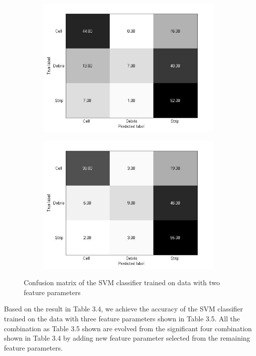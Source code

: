 \begin{figure}[!h]
\begin{subfigure}[b]{0.3\textwidth}
    \includegraphics[width=\textwidth]{confusion_matrix/fig3_3_e.jpg}
    \caption{}
  \end{subfigure}
  \begin{subfigure}[b]{0.3\textwidth}
    \includegraphics[width=\textwidth]{confusion_matrix/fig3_3_f.jpg}
    \caption{}
  \end{subfigure}
  \caption{Confusion matrix of the SVM classifier trained on data with two feature parameters}
\end{figure}
Based on the result in Table 3.4, we achieve the accuracy of the SVM classifier trained on the data with three feature parameters shown in Table 3.5. All the combination as Table 3.5 shown are evolved from the significant four combination shown in Table 3.4 by adding new feature parameter selected from the remaining feature parameters. 
